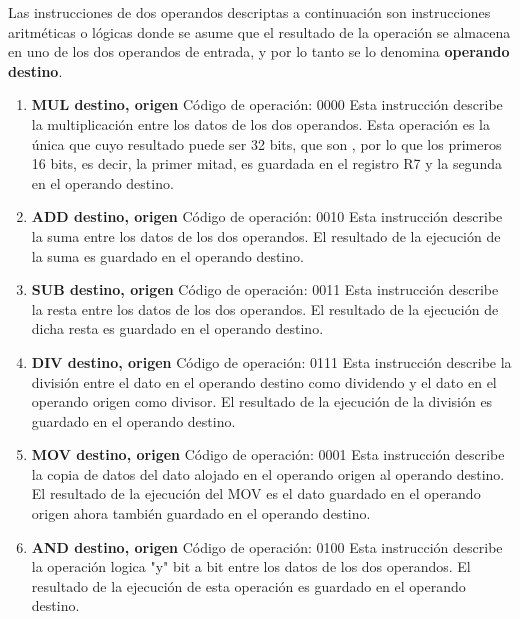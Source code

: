 


Las instrucciones de dos operandos descriptas a continuación son instrucciones aritméticas o lógicas donde se asume que el resultado de la operación se almacena en uno de los dos operandos de entrada, y por lo tanto se lo denomina \textbf{operando destino}.

\begin{enumerate}
\item \textbf{MUL destino, origen}
Código de operación: 0000
Esta instrucción describe la multiplicación entre los datos de los dos operandos. Esta operación es la única que cuyo resultado puede ser 32 bits, que son , por lo que los primeros 16 bits, es decir, la primer mitad, es guardada en el registro R7 y la segunda en el operando destino.
 
\item \textbf{ADD destino, origen}
Código de operación: 0010
Esta instrucción describe la suma entre los datos de los dos operandos. El resultado de la ejecución de la suma es guardado en el operando destino.

\item \textbf{SUB destino, origen}
Código de operación: 0011
Esta instrucción describe la resta entre los datos de los dos operandos. El resultado de la ejecución de dicha resta es guardado en el operando destino.

\item \textbf{DIV destino, origen}
Código de operación: 0111
Esta instrucción describe la división entre el dato en el operando destino como dividendo y el dato en el operando origen como divisor. El resultado de la ejecución de la división es guardado en el operando destino.

\item \textbf{MOV destino, origen}
Código de operación: 0001
Esta instrucción describe la copia de datos del dato alojado en el operando origen al operando destino. El resultado de la ejecución del MOV es el dato guardado en el operando origen ahora también guardado en el operando destino.

\item \textbf{AND destino, origen}
Código de operación: 0100
Esta instrucción describe la operación logica "y" bit a bit entre los datos de los dos operandos. El resultado de la ejecución de esta operación es guardado en el operando destino.


\end{enumerate}
